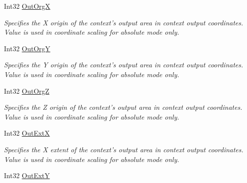 \begin{DoxyCompactItemize}
Int32 \hyperlink{class_wintab_d_n_1_1_c_wintab_context_a15ccc1a63dd18dcca3518d770dbade1c}{OutOrgX}
\begin{DoxyCompactList}\small\item\em Specifies the X origin of the context's output area in context output coordinates. Value is used in coordinate scaling for absolute mode only. \item\end{DoxyCompactList}\item 
Int32 \hyperlink{class_wintab_d_n_1_1_c_wintab_context_ae59a99d957925924554d483a4eb386d0}{OutOrgY}
\begin{DoxyCompactList}\small\item\em Specifies the Y origin of the context's output area in context output coordinates. Value is used in coordinate scaling for absolute mode only. \item\end{DoxyCompactList}\item 
Int32 \hyperlink{class_wintab_d_n_1_1_c_wintab_context_a9d4a0230b1d39404c34d24323f994796}{OutOrgZ}
\begin{DoxyCompactList}\small\item\em Specifies the Z origin of the context's output area in context output coordinates. Value is used in coordinate scaling for absolute mode only. \item\end{DoxyCompactList}\item 
Int32 \hyperlink{class_wintab_d_n_1_1_c_wintab_context_a55c2bd2bf147d521c43f5eff28674cd5}{OutExtX}
\begin{DoxyCompactList}\small\item\em Specifies the X extent of the context's output area in context output coordinates. Value is used in coordinate scaling for absolute mode only. \item\end{DoxyCompactList}\item 
Int32 \hyperlink{class_wintab_d_n_1_1_c_wintab_context_a2c6260f026f198fb05b9ff421bed158b}{OutExtY}

\end{DoxyCompactItemize}
